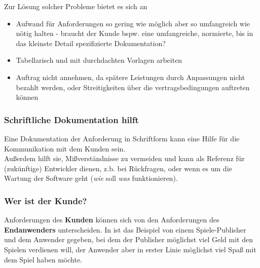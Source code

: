 \noindent
Zur Lösung solcher Probleme bietet es sich an

\begin{itemize}
    \item Aufwand für Anforderungen so gering wie möglich aber so umfangreich wie nötig halten - braucht der Kunde bspw. eine umfangreiche, normierte, bis in das kleinste Detail spezifizierte Dokumentation?
    \item Tabellarisch und mit durchdachten Vorlagen arbeiten
    \item Auftrag nicht annehmen, da spätere Leistungen durch Anpassungen nicht bezahlt werden, oder Streitigkeiten über die vertragsbedingungen auftreten können
\end{itemize}


\subsubsection*{Schriftliche Dokumentation hilft}
Eine Dokumentation der Anforderung in Schriftform kann eine Hilfe für die Kommunikation mit dem Kunden sein.\\
Außerdem hilft sie, Mißverständnisse zu vermeiden und kann als Referenz für (zukünftige) Entwickler dienen, z.b. bei Rückfragen, oder wenn es um die Wartung der Software geht (\textit{wie} soll \textit{was} funktionieren).\\


\subsubsection*{Wer ist der Kunde?}
Anforderungen des \textbf{Kunden} können sich von den Anforderungen des \textbf{Endanwenders} unterscheiden.
In \cite[41]{Wed09} ist das Beispiel von einem Spiele-Publisher und dem Anwender gegeben, bei dem der Publisher möglichst viel Geld mit den Spielen verdienen will, der Anwender aber in erster Linie möglichst viel Spaß mit dem Spiel haben möchte.
